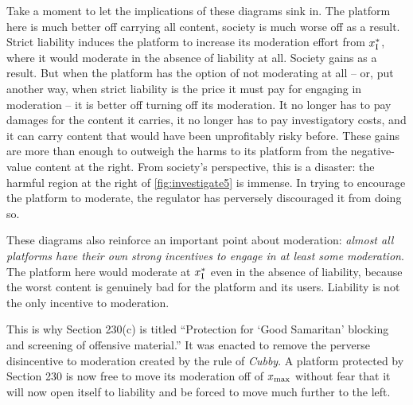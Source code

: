 Take a moment to let the implications of these diagrams sink in. The platform here is much better off carrying all content, society is much worse off as a result. Strict liability induces the platform to increase its moderation effort from $x_{\text{I}}^*$, where it would moderate in the absence of liability at all. Society gains as a result. But when the platform has the option of not moderating at all -- or, put another way, when strict liability is the price it must pay for engaging in moderation -- it is better off turning off its moderation. It no longer has to pay damages for the content it carries, it no longer has to pay investigatory costs, and it can carry content that would have been unprofitably risky before. These gains are more than enough to outweigh the harms to its platform from the negative-value content at the right. From society's perspective, this is a disaster: the harmful region at the right of \autoref{fig:investigate5} is immense. In trying to encourage the platform to moderate, the regulator has perversely discouraged it from doing so.

These diagrams also reinforce an important point about moderation: \emph{almost all platforms have their own strong incentives to engage in at least some moderation}. The platform here would moderate at $x_{\text{I}}^*$ even in the absence of liability, because the worst content is genuinely bad for the platform and its users. Liability is not the only incentive to moderation.

This is why Section 230(c) is titled ``Protection for `Good Samaritan' blocking and screening of offensive material.'' It was enacted to remove the perverse disincentive to moderation created by the rule of \emph{Cubby}. A platform protected by Section 230 is now free to move its moderation off of $x_{\text{max}}$ without fear that it will now open itself to liability and be forced to move much further to the left.





% 
%
% 





% 
% 
% 
% 
% 









